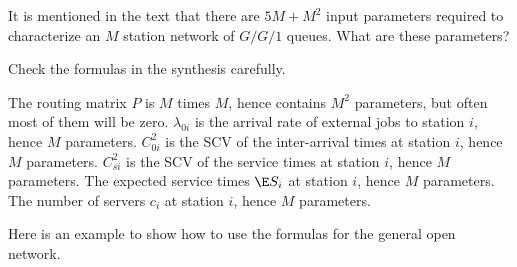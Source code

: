 \begin{exercise}
  It is mentioned in the text that there are $5M+M^2$ input parameters
  required to characterize an $M$ station network of $G/G/1$ queues. What are these parameters?
\begin{hint}
 Check the formulas in the synthesis carefully.
\end{hint}
\begin{solution}
 The routing matrix $P$ is $M$ times $M$, hence contains
      $M^2$ parameters, but often most of them will be zero.
 $\lambda_{0i}$ is the arrival rate of external jobs to station $i$, hence $M$ parameters.
 $C_{0i}^2$ is the SCV of the inter-arrival times at station
      $i$, hence $M$ parameters.
 $C_{si}^2$ is the SCV of the service times at station $i$,
      hence $M$ parameters.
 The expected service times $\E S_i$ at station $i$, 
      hence $M$ parameters.
 The number of servers $c_i$ at station $i$, hence $M$
      parameters.
\end{solution}
\end{exercise}


Here is an example to show how to use the formulas for the general open network.

